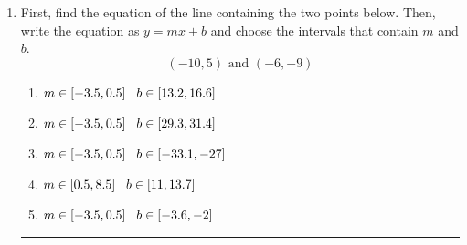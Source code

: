 \documentclass[14pt]{extbook}
\newcommand{\litem}[1]{\item#1\hspace*{-1cm}\rule{\textwidth}{0.4pt}}
\begin{document}
\begin{enumerate}
{\begin{enumerate}[label=\Alph*.]
\end{enumerate} }
\litem{
First, find the equation of the line containing the two points below. Then, write the equation as $ y=mx+b $ and choose the intervals that contain $m$ and $b$.\[ (-10, 5) \text{ and } (-6, -9) \]\begin{enumerate}[label=\Alph*.]
\item \( m \in [-3.5, 0.5] \hspace*{3mm} b \in [13.2, 16.6] \)
\item \( m \in [-3.5, 0.5] \hspace*{3mm} b \in [29.3, 31.4] \)
\item \( m \in [-3.5, 0.5] \hspace*{3mm} b \in [-33.1, -27] \)
\item \( m \in [0.5, 8.5] \hspace*{3mm} b \in [11, 13.7] \)
\item \( m \in [-3.5, 0.5] \hspace*{3mm} b \in [-3.6, -2] \)

\end{enumerate} }
\end{enumerate}
\end{document}
